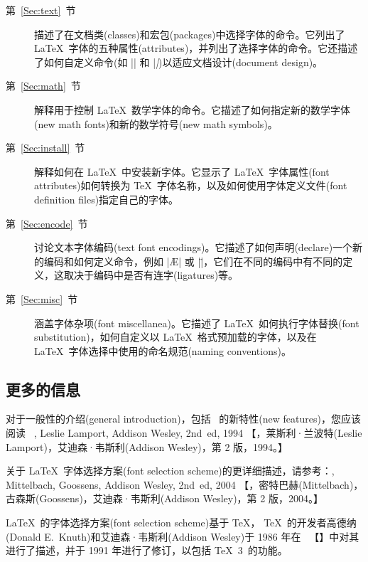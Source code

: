 \documentclass{ltxguide}[1995/11/28]
\newcommand{\heiti}{\CJKfamily{heiti}} %
\begin{document}
\begin{description}

\item[第~\ref{Sec:text}~节]  描述了在文档类(classes)和宏包(packages)中选择字体的命令。它列出了 \LaTeX{}\ 字体的五种属性(attributes)，并列出了选择字体的命令。它还描述了如何自定义命令(如 |\textrm| 和 |\textit|)以适应文档设计(document design)。

\item[第~\ref{Sec:math}~节]  解释用于控制 \LaTeX{}\ 数学字体的命令。它描述了如何指定新的数学字体(new math fonts)和新的数学符号(new math symbols)。

\item[第~\ref{Sec:install}~节]  解释如何在 \LaTeX\ 中安装新字体。它显示了 \LaTeX{}\ 字体属性(font attributes)如何转换为 \TeX{}\ 字体名称，以及如何使用字体定义文件(font definition files)指定自己的字体。

\item[第~\ref{Sec:encode}~节]  讨论文本字体编码(text font encodings)。它描述了如何声明(declare)一个新的编码和如何定义命令，例如 |\AE| 或 |\"|，它们在不同的编码中有不同的定义，这取决于编码中是否有连字(ligatures)等。

\item[第~\ref{Sec:misc}~节]  涵盖字体杂项(font miscellanea)。它描述了 \LaTeX{}\ 如何执行字体替换(font substitution)，如何自定义以 \LaTeX{}\ 格式预加载的字体，以及在 \LaTeX{}\ 字体选择中使用的命名规范(naming conventions)。

\end{description}

\subsection[更多的信息]{\heiti 更多的信息}

对于一般性的介绍(general introduction)，包括 \LaTeXe\ 的新特性(new features)，您应该阅读\ {\color{blue} {\emph{\LaTeXbook}}}, Leslie Lamport, Addison Wesley, 2nd~ed, 1994 \quad 【{\color{blue}{《\LaTeX：一个文档准备系统》}}，莱斯利·兰波特(Leslie Lamport)，艾迪森·韦斯利(Addison Wesley)，第 2 版，1994。】

关于 \LaTeX{}\ 字体选择方案(font selection scheme)的更详细描述，请参考：{\color{blue}{\emph{\LaTeXcomp}}}, Mittelbach, Goossens, Addison Wesley, 2nd~ed, 2004 \quad 【{}，密特巴赫(Mittelbach)，古森斯(Goossens)，艾迪森·韦斯利(Addison Wesley)，第 2 版，2004。】

\LaTeX{}\ 的字体选择方案(font selection scheme)基于 \TeX， \TeX\ 的开发者高德纳(Donald E.~Knuth)和艾迪森·韦斯利(Addison Wesley)于 1986 年在\ {} 【{\color{blue}{《特可爱原本》}}】中对其进行了描述，并于 1991 年进行了修订，以包括 \TeX~3\ 的功能。
\end{document}
